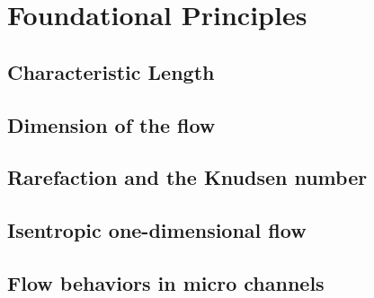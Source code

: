 \section{Foundational Principles}

\subsection{Characteristic Length}  

\newpage

\subsection{Dimension of the flow}


\subsection{Rarefaction and the Knudsen number}


\subsection{Isentropic one-dimensional flow}


\subsection{Flow behaviors in micro channels}


